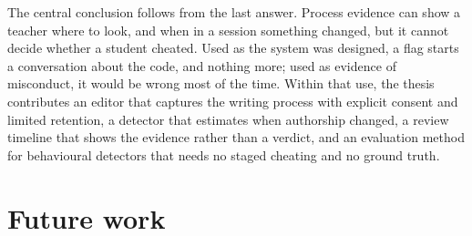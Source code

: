 The central conclusion follows from the last answer. Process evidence can show a
teacher where to look, and when in a session something changed, but it cannot
decide whether a student cheated. Used as the system was designed, a flag starts
a conversation about the code, and nothing more; used as evidence of misconduct,
it would be wrong most of the time. Within that use, the thesis contributes an
editor that captures the writing process with explicit consent and limited
retention, a detector that estimates when authorship changed, a review timeline
that shows the evidence rather than a verdict, and an evaluation method for
behavioural detectors that needs no staged cheating and no ground truth.

\section{Future work}

